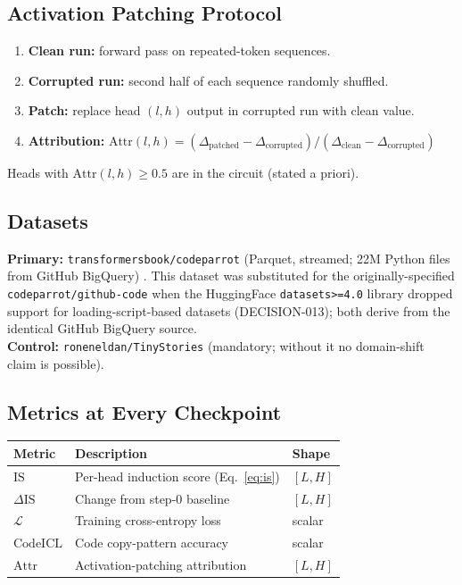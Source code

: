 \subsection{Activation Patching Protocol}
\begin{enumerate}[leftmargin=*,noitemsep]
  \item \textbf{Clean run:} forward pass on repeated-token sequences.
  \item \textbf{Corrupted run:} second half of each sequence randomly shuffled.
  \item \textbf{Patch:} replace head $(l,h)$ output in corrupted run with clean value.
  \item \textbf{Attribution:}
    $\text{Attr}(l,h) = (\Delta_\text{patched} - \Delta_\text{corrupted})
    / (\Delta_\text{clean} - \Delta_\text{corrupted})$
\end{enumerate}
Heads with $\text{Attr}(l,h) \geq 0.5$ are in the circuit (stated a priori).

\subsection{Datasets}
\textbf{Primary:} \texttt{transformersbook/codeparrot} (Parquet, streamed;
22M Python files from GitHub BigQuery) \citep{wolf2020transformers}.
This dataset was substituted for the originally-specified
\texttt{codeparrot/github-code} when the HuggingFace \texttt{datasets>=4.0}
library dropped support for loading-script-based datasets
(DECISION-013); both derive from the identical GitHub BigQuery source.\\
\textbf{Control:} \texttt{roneneldan/TinyStories} \citep{eldan2023tinystories}
(mandatory; without it no domain-shift claim is possible).

\subsection{Metrics at Every Checkpoint}
\begin{center}
\begin{tabular}{lll}
\toprule
Metric & Description & Shape \\
\midrule
$\text{IS}$ & Per-head induction score (Eq.~\ref{eq:is}) & $[L, H]$ \\
$\Delta\text{IS}$ & Change from step-0 baseline & $[L, H]$ \\
$\mathcal{L}$ & Training cross-entropy loss & scalar \\
$\text{CodeICL}$ & Code copy-pattern accuracy & scalar \\
$\text{Attr}$ & Activation-patching attribution & $[L, H]$ \\
\bottomrule
\end{tabular}
\end{center}

